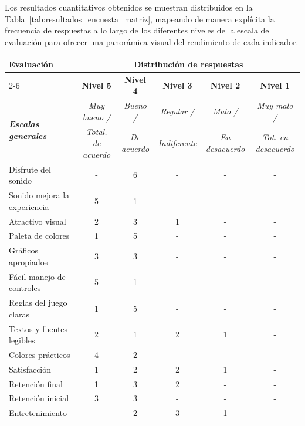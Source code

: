 Los resultados cuantitativos obtenidos se muestran distribuidos en la Tabla~\ref{tab:resultados_encuesta_matriz}, mapeando de manera explícita la frecuencia de respuestas a lo largo de los diferentes niveles de la escala de evaluación para ofrecer una panorámica visual del rendimiento de cada indicador.

\clearpage

\begin{table}[htbp]
	\centering
	\small
	\renewcommand{\arraystretch}{1.2}
	\begin{tabular}{|l|c|c|c|c|c|}
		\hline
		\multirow{2}{*}{\textbf{Evaluación}} & \multicolumn{5}{c|}{\textbf{Distribución de respuestas}} \\ \cline{2-6} 
		& \textbf{Nivel 5} & \textbf{Nivel 4} & \textbf{Nivel 3} & \textbf{Nivel 2} & \textbf{Nivel 1} \\ \hline
		\multirow{2}{*}{\textit{\textbf{Escalas generales}}} & \scriptsize{\textit{Muy bueno /}} & \scriptsize{\textit{Bueno /}} & \scriptsize{\textit{Regular /}} & \scriptsize{\textit{Malo /}} & \scriptsize{\textit{Muy malo /}} \\
		& \scriptsize{\textit{Total. de acuerdo}} & \scriptsize{\textit{De acuerdo}} & \scriptsize{\textit{Indiferente}} & \scriptsize{\textit{En desacuerdo}} & \scriptsize{\textit{Tot. en desacuerdo}} \\ \hline
		Disfrute del sonido & - & 6 & - & - & - \\ \hline
		Sonido mejora la experiencia & 5 & 1 & - & - & - \\ \hline
		Atractivo visual & 2 & 3 & 1 & - & - \\ \hline
		Paleta de colores & 1 & 5 & - & - & - \\ \hline
		Gráficos apropiados & 3 & 3 & - & - & - \\ \hline
		Fácil manejo de controles & 5 & 1 & - & - & - \\ \hline
		Reglas del juego claras & 1 & 5 & - & - & - \\ \hline
		Textos y fuentes legibles & 2 & 1 & 2 & 1 & - \\ \hline
		Colores prácticos & 4 & 2 & - & - & - \\ \hline
		Satisfacción & 1 & 2 & 2 & 1 & - \\ \hline
		Retención final & 1 & 3 & 2 & - & - \\ \hline
		Retención inicial & 3 & 3 & - & - & - \\ \hline
		Entretenimiento & - & 2 & 3 & 1 & - \\ \hline

\end{tabular}
\end{table}
